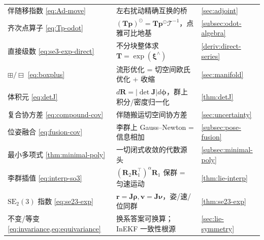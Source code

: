 \begin{table}[H]
\begin{tabular}{lll}
伴随移指数 \cref{eq:Ad-move} & 左右扰动精确互换的桥 & \cref{sec:adjoint} \\
齐次点算子 \cref{eq:Tp-odot} & $(\mathbf{T}\mathbf{p})^\odot=\mathbf{T}\mathbf{p}^\odot\boldsymbol{\mathcal{T}}^{-1}$，点雅可比地基 & \cref{subsec:odot-algebra} \\
直接级数 \cref{eq:se3-exp-direct} & 不分块整体求 $\mathbf{T}=\exp(\boldsymbol{\xi}^\wedge)$ & \cref{deriv:direct-series} \\
$\boxplus/\boxminus$ \cref{eq:boxplus} & 流形优化 = 切空间欧氏优化 + 收缩 & \cref{sec:manifold} \\
体积元 \cref{eq:detJ} & $d\mathbf{R}=|\det\mathbf{J}|d\boldsymbol{\phi}$，群上积分/密度归一化 & \cref{thm:detJ} \\
复合协方差 \cref{eq:compound-cov} & 伴随搬运切空间协方差 & \cref{sec:uncertainty} \\
位姿融合 \cref{eq:fusion-cov} & 李群上 Gauss--Newton = 信息相加 & \cref{subsec:pose-fusion} \\
最小多项式 \cref{thm:minimal-poly} & 一切闭式收敛的代数源头 & \cref{subsec:minimal-poly} \\
李群插值 \cref{eq:interp-so3} & $(\mathbf{R}_2\mathbf{R}_1^\top)^\alpha\mathbf{R}_1$ 保群 = 匀速运动 & \cref{thm:lie-interp} \\
$\mathrm{SE}_2(3)$ 指数 \cref{eq:se23-exp} & $\mathbf{r}=\mathbf{J}\boldsymbol{\rho},\mathbf{v}=\mathbf{J}\boldsymbol{\nu}$，姿/速/位同群 & \cref{thm:se23-exp} \\
不变/等变 \cref{eq:invariance,eq:equivariance} & 换系答案可换算；InEKF 一致性根源 & \cref{sec:lie-symmetry} \\
\bottomrule
\end{tabular}
\end{table}

